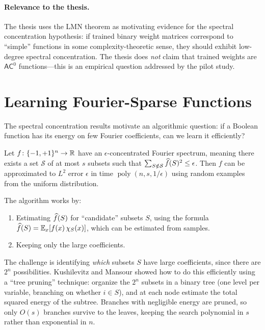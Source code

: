 \paragraph{Relevance to the thesis.}
The thesis uses the LMN theorem as motivating evidence for the spectral
concentration hypothesis: if trained binary weight matrices correspond to
``simple'' functions in some complexity-theoretic sense, they should
exhibit low-degree spectral concentration. The thesis does \emph{not}
claim that trained weights are $\mathsf{AC}^0$ functions---this is an
empirical question addressed by the pilot study.


\section{Learning Fourier-Sparse Functions}\label{sec:km-algorithm}

The spectral concentration results motivate an algorithmic question: if a
Boolean function has its energy on few Fourier coefficients, can we learn
it efficiently?

\begin{theorem}
\label{thm:km}
Let $f \colon \{-1,+1\}^n \to \mathbb{R}$ have an $\epsilon$-concentrated Fourier
spectrum, meaning there exists a set $\mathcal{S}$ of at most $s$ subsets
such that $\sum_{S \notin \mathcal{S}} \widehat{f}(S)^2 \leq \epsilon$. Then
$f$ can be approximated to $L^2$ error $\epsilon$ in time
$\operatorname{poly}(n, s, 1/\epsilon)$ using random examples from the
uniform distribution.
\end{theorem}

The algorithm works by:
\begin{enumerate}
  \item Estimating $\widehat{f}(S)$ for ``candidate'' subsets $S$, using the
    formula $\widehat{f}(S) = \mathbb{E}_x[f(x)\,\chi_S(x)]$, which can be estimated
    from samples.
  \item Keeping only the large coefficients.
\end{enumerate}

The challenge is identifying \emph{which} subsets $S$ have large
coefficients, since there are $2^n$ possibilities. Kushilevitz and
Mansour showed how to do this efficiently using a ``tree pruning''
technique: organize the $2^n$ subsets in a binary tree (one level per
variable, branching on whether $i \in S$), and at each node estimate the
total squared energy of the subtree. Branches with negligible energy are
pruned, so only $O(s)$ branches survive to the leaves, keeping the
search polynomial in $s$ rather than exponential in $n$.

